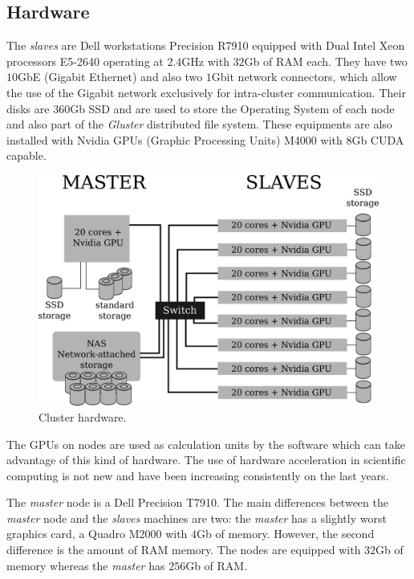 \documentclass[twoside,a4paper,12pt,english]{inac19}
\begin{document}
\subsection{Hardware}

The \textit{slaves} are Dell workstations Precision R7910 equipped
with Dual Intel{\textregistered} Xeon{\textregistered} processors E5-2640 operating at $2.4$GHz with
$32$Gb of RAM each. They have two $10$GbE (Gigabit Ethernet) and also two $1$Gbit network connectors, which
allow the use of the Gigabit network exclusively for intra-cluster communication. Their disks are $360$Gb SSD
and are used to store the Operating System of each node and also part of the \textit{Gluster} distributed
file system. These equipments are also installed with Nvidia{\textregistered} GPUs (Graphic Processing Units) M4000{\textregistered} with $8$Gb CUDA\cite{CUDA} capable.

\begin{figure}[h] %
  \centering\includegraphics[scale=0.7]{images/cluster-topologico.png}
  \caption{Cluster hardware.}
  \label{fig:cluster}
\end{figure}

The GPUs on nodes are used as calculation units by the software which can take advantage of this kind of hardware.
The use of hardware acceleration in scientific computing is not new and have been increasing consistently on the
last years\cite{accelerators}.

The \textit{master} node is a Dell Precision T7910. The main
differences between the \textit{master} node and the \textit{slaves} machines are two: the \textit{master} has
a slightly worst graphics card, a Quadro{\textregistered} M2000 with $4$Gb of memory. However, the second difference
is the amount of RAM memory. The nodes are equipped with $32$Gb of memory whereas the \textit{master} has
$256$Gb of RAM.
\end{document}
